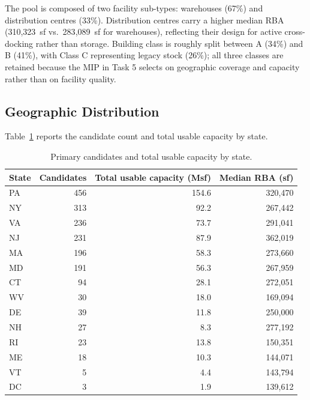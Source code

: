 The pool is composed of two facility sub-types: warehouses (67\%) and distribution
centres (33\%). Distribution centres carry a higher median RBA (310{,}323~sf vs.\
283{,}089~sf for warehouses), reflecting their design for active cross-docking rather
than storage. Building class is roughly split between A (34\%) and B (41\%), with Class
C representing legacy stock (26\%); all three classes are retained because the MIP in
Task 5 selects on geographic coverage and capacity rather than on facility quality.

\subsection{Geographic Distribution}

Table~\ref{tab:task4-state} reports the candidate count and total usable capacity by
state.

\begin{table}[H]
  \centering
  \caption{Primary candidates and total usable capacity by state.}
  \label{tab:task4-state}
  \begin{tabularx}{\textwidth}{lrrr}
    \toprule
    State & Candidates & Total usable capacity (Msf) & Median RBA (sf) \\
    \midrule
    PA & 456 & 154.6 & 320{,}470 \\
    NY & 313 & \phantom{0}92.2 & 267{,}442 \\
    VA & 236 & \phantom{0}73.7 & 291{,}041 \\
    NJ & 231 & \phantom{0}87.9 & 362{,}019 \\
    MA & 196 & \phantom{0}58.3 & 273{,}660 \\
    MD & 191 & \phantom{0}56.3 & 267{,}959 \\
    CT & \phantom{0}94 & \phantom{0}28.1 & 272{,}051 \\
    WV & \phantom{0}30 & \phantom{0}18.0 & 169{,}094 \\
    DE & \phantom{0}39 & \phantom{0}11.8 & 250{,}000 \\
    NH & \phantom{0}27 & \phantom{0}\phantom{0}8.3 & 277{,}192 \\
    RI & \phantom{0}23 & \phantom{0}13.8 & 150{,}351 \\
    ME & \phantom{0}18 & \phantom{0}10.3 & 144{,}071 \\
    VT & \phantom{0}\phantom{0}5 & \phantom{0}\phantom{0}4.4 & 143{,}794 \\
    DC & \phantom{0}\phantom{0}3 & \phantom{0}\phantom{0}1.9 & 139{,}612 \\
    \bottomrule
  \end{tabularx}
\end{table}

